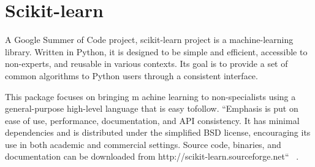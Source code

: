 \section{Scikit-learn}

A Google Summer of Code project, 
scikit-learn project is a
machine-learning library.  
Written in Python, it is designed to be
simple and efficient, accessible to 
non-experts, and reusable in
various contexts. Its goal is to provide a 
set of common algorithms to
Python users through a consistent interface.

This package focuses on bringing m
achine learning to non-specialists
using a general-purpose high-level 
language that is easy tofollow. 
``Emphasis is put on ease of use, performance, 
documentation, and API consistency. 
It has minimal dependencies and is distributed
under the simplified BSD license, 
encouraging its use in both academic
and commercial settings. Source code, 
binaries, and documentation can
be downloaded from http://scikit-learn.sourceforge.net``
~\cite{hid-sp18-506-Scikit-learn}.
